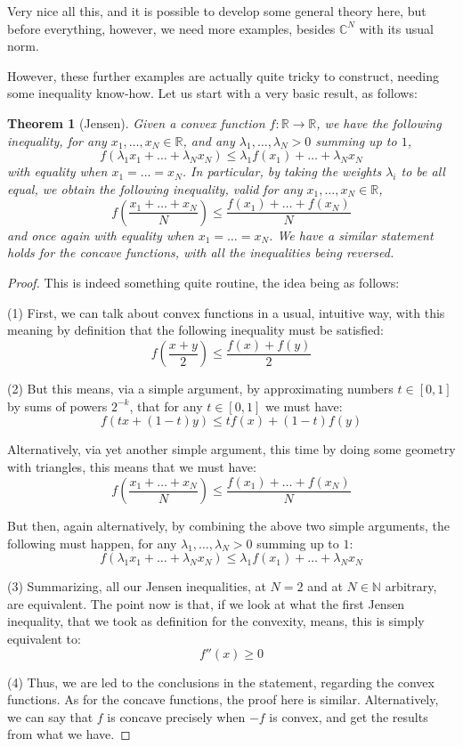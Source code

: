 \documentclass[12pt]{amsbook}
\newtheorem{theorem}{Theorem}[chapter]
\begin{document}
Very nice all this, and it is possible to develop some general theory here, but before everything, however, we need more examples, besides $\mathbb C^N$ with its usual norm. 

\bigskip

However, these further examples are actually quite tricky to construct, needing some inequality know-how. Let us start with a very basic result, as follows:


\begin{theorem}[Jensen]
Given a convex function $f:\mathbb R\to\mathbb R$, we have the following inequality, for any $x_1,\ldots,x_N\in\mathbb R$, and any $\lambda_1,\ldots,\lambda_N>0$ summing up to $1$,
$$f(\lambda_1x_1+\ldots+\lambda_Nx_N)\leq\lambda_1f(x_1)+\ldots+\lambda_Nx_N$$
with equality when $x_1=\ldots=x_N$. In particular, by taking the weights $\lambda_i$ to be all equal, we obtain the following inequality, valid for any $x_1,\ldots,x_N\in\mathbb R$,
$$f\left(\frac{x_1+\ldots+x_N}{N}\right)\leq\frac{f(x_1)+\ldots+f(x_N)}{N}$$
and once again with equality when $x_1=\ldots=x_N$. We have a similar statement holds for the concave functions, with all the inequalities being reversed.
\end{theorem}

\begin{proof}
This is indeed something quite routine, the idea being as follows:

\medskip

(1) First, we can talk about convex functions in a usual, intuitive way, with this meaning by definition that the following inequality must be satisfied:
$$f\left(\frac{x+y}{2}\right)\leq\frac{f(x)+f(y)}{2}$$

(2) But this means, via a simple argument, by approximating numbers $t\in[0,1]$ by sums of powers $2^{-k}$, that for any $t\in[0,1]$ we must have:
$$f(tx+(1-t)y)\leq tf(x)+(1-t)f(y)$$

Alternatively, via yet another simple argument, this time by doing some geometry with triangles, this means that we must have:
$$f\left(\frac{x_1+\ldots+x_N}{N}\right)\leq\frac{f(x_1)+\ldots+f(x_N)}{N}$$

But then, again alternatively, by combining the above two simple arguments, the following must happen, for any $\lambda_1,\ldots,\lambda_N>0$ summing up to $1$:
$$f(\lambda_1x_1+\ldots+\lambda_Nx_N)\leq\lambda_1f(x_1)+\ldots+\lambda_Nx_N$$

(3) Summarizing, all our Jensen inequalities, at $N=2$ and at $N\in\mathbb N$ arbitrary, are equivalent. The point now is that, if we look at what the first Jensen inequality, that we took as definition for the convexity, means, this is simply equivalent to:
$$f''(x)\geq0$$

(4) Thus, we are led to the conclusions in the statement, regarding the convex functions. As for the concave functions, the proof here is similar. Alternatively, we can say that $f$ is concave precisely when $-f$ is convex, and get the results from what we have.
\end{proof}
\end{document}
